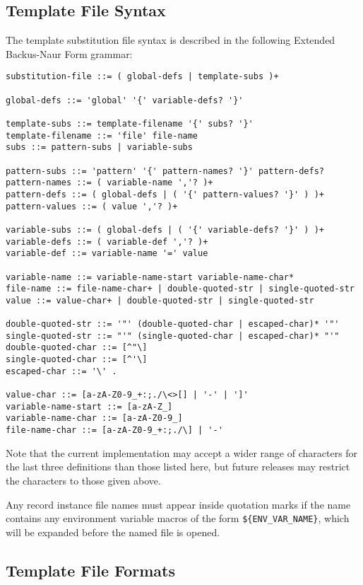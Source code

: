 \subsection{Template File Syntax}

The template substitution file syntax is described in the following Extended Backus-Naur Form grammar:

\begin{lstlisting}[language=dbd]
substitution-file ::= ( global-defs | template-subs )+

global-defs ::= 'global' '{' variable-defs? '}'

template-subs ::= template-filename '{' subs? '}'
template-filename ::= 'file' file-name
subs ::= pattern-subs | variable-subs

pattern-subs ::= 'pattern' '{' pattern-names? '}' pattern-defs?
pattern-names ::= ( variable-name ','? )+
pattern-defs ::= ( global-defs | ( '{' pattern-values? '}' ) )+
pattern-values ::= ( value ','? )+

variable-subs ::= ( global-defs | ( '{' variable-defs? '}' ) )+
variable-defs ::= ( variable-def ','? )+
variable-def ::= variable-name '=' value

variable-name ::= variable-name-start variable-name-char*
file-name ::= file-name-char+ | double-quoted-str | single-quoted-str
value ::= value-char+ | double-quoted-str | single-quoted-str

double-quoted-str ::= '"' (double-quoted-char | escaped-char)* '"'
single-quoted-str ::= "'" (single-quoted-char | escaped-char)* "'"
double-quoted-char ::= [^"\]
single-quoted-char ::= [^'\]
escaped-char ::= '\' .

value-char ::= [a-zA-Z0-9_+:;./\<>[] | '-' | ']'
variable-name-start ::= [a-zA-Z_]
variable-name-char ::= [a-zA-Z0-9_]
file-name-char ::= [a-zA-Z0-9_+:;./\] | '-'
\end{lstlisting}

Note that the current implementation may accept a wider range of characters for the last three definitions than those listed here, but future releases may restrict the characters to those given above.

Any record instance file names must appear inside quotation marks if the name contains any environment variable macros of the form \verb|${ENV_VAR_NAME}|, which will be expanded before the named file is opened.

\subsection{Template File Formats}

